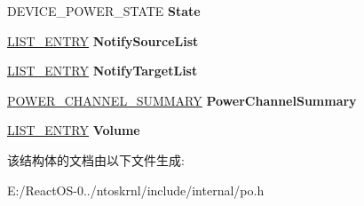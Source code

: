 \begin{DoxyCompactItemize}
\item 
\mbox{\label{struct___d_e_v_i_c_e___o_b_j_e_c_t___p_o_w_e_r___e_x_t_e_n_s_i_o_n_af2d979e891d7590c906a38c47f708a4a}} 
D\+E\+V\+I\+C\+E\+\_\+\+P\+O\+W\+E\+R\+\_\+\+S\+T\+A\+TE {\bfseries State}
\item 
\mbox{\label{struct___d_e_v_i_c_e___o_b_j_e_c_t___p_o_w_e_r___e_x_t_e_n_s_i_o_n_a6e04e63fd83f80648c0b11d3cd2cc40f}} 
\hyperlink{struct___l_i_s_t___e_n_t_r_y}{L\+I\+S\+T\+\_\+\+E\+N\+T\+RY} {\bfseries Notify\+Source\+List}
\item 
\mbox{\label{struct___d_e_v_i_c_e___o_b_j_e_c_t___p_o_w_e_r___e_x_t_e_n_s_i_o_n_a4ee29befe6bda5fdd945e4100b91bcef}} 
\hyperlink{struct___l_i_s_t___e_n_t_r_y}{L\+I\+S\+T\+\_\+\+E\+N\+T\+RY} {\bfseries Notify\+Target\+List}
\item 
\mbox{\label{struct___d_e_v_i_c_e___o_b_j_e_c_t___p_o_w_e_r___e_x_t_e_n_s_i_o_n_aab68cdbf200a710fdda4b370f4a58851}} 
\hyperlink{struct___p_o_w_e_r___c_h_a_n_n_e_l___s_u_m_m_a_r_y}{P\+O\+W\+E\+R\+\_\+\+C\+H\+A\+N\+N\+E\+L\+\_\+\+S\+U\+M\+M\+A\+RY} {\bfseries Power\+Channel\+Summary}
\item 
\mbox{\label{struct___d_e_v_i_c_e___o_b_j_e_c_t___p_o_w_e_r___e_x_t_e_n_s_i_o_n_a1f3c8781a2965030e7b2c563da4d32b7}} 
\hyperlink{struct___l_i_s_t___e_n_t_r_y}{L\+I\+S\+T\+\_\+\+E\+N\+T\+RY} {\bfseries Volume}
\end{DoxyCompactItemize}


该结构体的文档由以下文件生成\+:\begin{DoxyCompactItemize}
\item 
E\+:/\+React\+O\+S-\/0../ntoskrnl/include/internal/po.\+h\end{DoxyCompactItemize}
